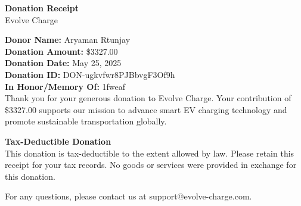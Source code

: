 \documentclass[a4paper,12pt]{article}
\begin{document}
\begin{center}
{\Large \textbf{Donation Receipt}}\\
\vspace{0.5cm}
Evolve Charge
\end{center}

\vspace{0.5cm}

\noindent
{\bf Donor Name:} Aryaman Rtunjay\\
{\bf Donation Amount:} \$3327.00\\
{\bf Donation Date:} May 25, 2025\\
{\bf Donation ID:} DON-ugkvfwr8PJBbvgF3Of9h\\
\noindent
{\bf In Honor/Memory Of:} 1fweaf\\

\vspace{0.5cm}
\noindent
Thank you for your generous donation to Evolve Charge. Your contribution of \$3327.00 supports our mission to advance smart EV charging technology and promote sustainable transportation globally.

\vspace{0.5cm}

\noindent
{\bf Tax-Deductible Donation}\\
This donation is tax-deductible to the extent allowed by law. Please retain this receipt for your tax records. No goods or services were provided in exchange for this donation.

\vspace{0.5cm}

\noindent
For any questions, please contact us at support@evolve-charge.com.
\end{document}
